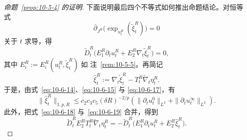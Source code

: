 \begin{proof}[命题~\ref{prop:10-5-4} 的证明]
下面说明最后四个不等式如何推出命题结论。对恒等式
\[
  \bar\partial_{J^R}
    \bigl(\exp_{u_t^R}(\widetilde\xi_t^R)\bigr)=0
\]
关于 $t$ 求导，得
\begin{equation}\label{eq:10-6-18}
  \widetilde D_t^R
  \bigl(E_1^R\partial_tu_t^R
        +E_2^R\nabla_t\widetilde\xi_t^R\bigr)=0,
\end{equation}
其中 $E_i^R:=E_i^R(u_t^R,\widetilde\xi_t^R)$ 如
注~\ref{rem:10-5-5}。再简记
\begin{equation}\label{eq:10-6-19}
  \widehat\xi_t^R
  :=\nabla_t\widetilde\xi_t^R
    -T_t^R\widetilde\nabla_t\eta_t^R.
\end{equation}
于是，由式~\eqref{eq:10-6-14}、\eqref{eq:10-6-15} 与
\eqref{eq:10-6-17}，有
\begin{equation}\label{eq:10-6-20}
  \|\widehat\xi_t^R\|_{1,p,R}
  \le c_2c_3c_5(\delta R)^{-2/p}
  \left(
    \|\partial_tu_t^0\|_{L^2}
    +\|\partial_tu_t^\infty\|_{L^2}
  \right).
\end{equation}
此外，把式~\eqref{eq:10-6-18} 与~\eqref{eq:10-6-19} 合并，得到
\begin{equation}\label{eq:10-6-21}
  \widetilde D_t^RE_2^RT_t^R\widetilde\nabla_t\eta_t^R
  =-\widetilde D_t^R
    \bigl(E_1^R\partial_tu_t^R+E_2^R\widehat\xi_t^R\bigr).
\end{equation}


\end{proof}
